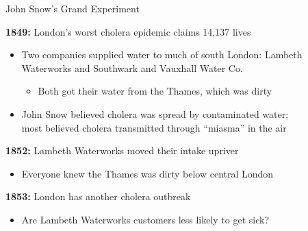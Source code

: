 \documentclass[10pt,xcolor=table,ignorenonframetext,handout,aspectratio=169]{beamer}
\newlength{\wideitemsep}
\let\olditem\item
\renewcommand{\item}{\setlength{\itemsep}{\wideitemsep}\olditem}
\begin{document}

\begin{frame}{John Snow's Grand Experiment}

\medskip
\textbf{1849:}  London's worst cholera epidemic claims 14,137 lives

\medskip
\begin{itemize}
	
	\item Two companies supplied water to much of south London:  Lambeth Waterworks and Southwark and Vauxhall Water Co.
	
	\medskip
	\begin{itemize}
		
		\item Both got their water from the Thames, which was dirty
		
	\end{itemize}
	
	\pause
	\item
	John Snow believed cholera was spread by contaminated water; \\
	most believed cholera transmitted through ``miasma'' in the air
	
\end{itemize}

\pause
\medskip
\textbf{1852:}  Lambeth Waterworks moved their intake upriver

\medskip
\begin{itemize}
	
	\item Everyone knew the Thames was dirty below central London
	
\end{itemize}

\pause
\medskip
\textbf{1853:}  London has another cholera outbreak

\medskip
\begin{itemize}
	
	\item Are Lambeth Waterworks customers less likely to get sick?
	
\end{itemize}

\end{frame}


\end{document}
